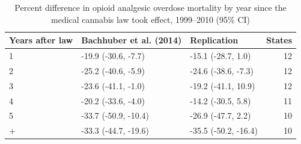 \begin{table}

\caption{Percent difference in opioid analgesic overdose mortality by year since the medical cannabis law took effect, 1999--2010 (95\% CI)}
\centering
\begin{tabular}[t]{lllr}
\toprule
Years after law & Bachhuber et al. (2014) & Replication & States\\
\midrule
1 & -19.9 (-30.6, -7.7) & -15.1 (-28.7, 1.0) & 12\\
2 & -25.2 (-40.6, -5.9) & -24.6 (-38.6, -7.3) & 12\\
3 & -23.6 (-41.1, -1.0) & -19.2 (-41.1, 10.9) & 12\\
4 & -20.2 (-33.6, -4.0) & -14.2 (-30.5, 5.8) & 11\\
5 & -33.7 (-50.9, -10.4) & -26.9 (-47.7, 2.2) & 10\\
\addlinespace
6+ & -33.3 (-44.7, -19.6) & -35.5 (-50.2, -16.4) & 10\\
\bottomrule
\end{tabular}
\end{table}
